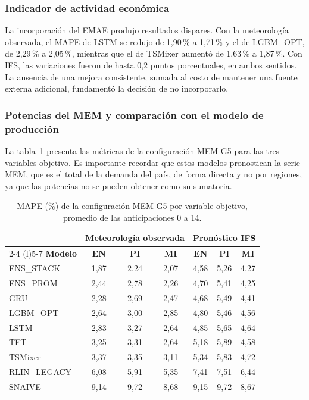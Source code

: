\subsubsection{Indicador de actividad económica}

La incorporación del EMAE produjo resultados dispares. Con la meteorología observada, el MAPE de LSTM se redujo de 1,90\,\% a 1,71\,\% y el de LGBM\_OPT, de 2,29\,\% a 2,05\,\%, mientras que el de TSMixer aumentó de 1,63\,\% a 1,87\,\%. Con IFS, las variaciones fueron de hasta 0,2 puntos porcentuales, en ambos sentidos. La ausencia de una mejora consistente, sumada al costo de mantener una fuente externa adicional, fundamentó la decisión de no incorporarlo.

\subsubsection{Potencias del MEM y comparación con el modelo de producción}

La tabla~\ref{tab:resultados_mem_g5} presenta las métricas de la configuración MEM G5 para las tres variables objetivo. Es importante recordar que estos modelos pronostican la serie MEM, que es el total de la demanda del país, de forma directa y no por regiones, ya que las potencias no se pueden obtener como su sumatoria.

\begin{table}[H]
	\centering
	\caption{MAPE (\%) de la configuración MEM G5 por variable objetivo, promedio de las anticipaciones 0 a 14.}
	\label{tab:resultados_mem_g5}
	\small
	\setlength{\tabcolsep}{4pt}
	\renewcommand{\arraystretch}{1.15}
	\begin{tabular*}{\textwidth}{@{\extracolsep{\fill}}lcccccc@{}}
		\toprule
		& \multicolumn{3}{c}{\textbf{Meteorología observada}} & \multicolumn{3}{c}{\textbf{Pronóstico IFS}} \\
		\cmidrule(lr){2-4} \cmidrule(l){5-7}
		\textbf{Modelo} & \textbf{EN} & \textbf{PI} & \textbf{MI} & \textbf{EN} & \textbf{PI} & \textbf{MI} \\
		\midrule
		ENS\_STACK & 1,87 & 2,24 & 2,07 & 4,58 & 5,26 & 4,27 \\
		ENS\_PROM & 2,44 & 2,78 & 2,26 & 4,70 & 5,41 & 4,25 \\
		GRU & 2,28 & 2,69 & 2,47 & 4,68 & 5,49 & 4,41 \\
		LGBM\_OPT & 2,64 & 3,00 & 2,85 & 4,80 & 5,46 & 4,56 \\
		LSTM & 2,83 & 3,27 & 2,64 & 4,85 & 5,65 & 4,64 \\
		TFT & 3,25 & 3,31 & 2,64 & 5,18 & 5,89 & 4,58 \\
		TSMixer & 3,37 & 3,35 & 3,11 & 5,34 & 5,83 & 4,72 \\
		RLIN\_LEGACY & 6,08 & 5,91 & 5,35 & 7,41 & 7,51 & 6,44 \\
		SNAIVE & 9,14 & 9,72 & 8,68 & 9,15 & 9,72 & 8,67 \\
		\bottomrule
	\end{tabular*}
\end{table}

